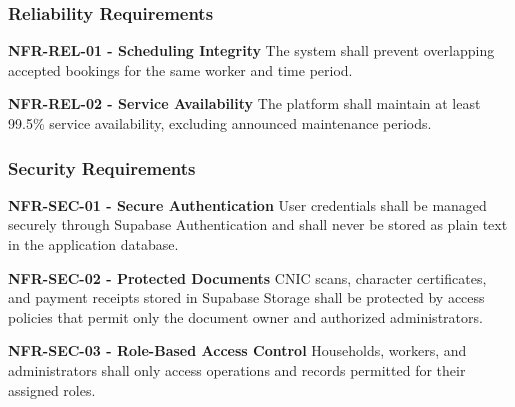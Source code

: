 \documentclass[12pt,a4paper]{article}
\begin{document}
\subsubsection{Reliability Requirements}
\begin{list}{}{\setlength{\leftmargin}{1.5em}\setlength{\labelsep}{0.5em}\setlength{\topsep}{2pt}\setlength{\itemsep}{6pt}\setlength{\parsep}{0pt}}
\item[\textbullet] \textbf{NFR-REL-01 - Scheduling Integrity}\newline{}
The system shall prevent overlapping accepted bookings for the same worker and time period.

\item[\textbullet] \textbf{NFR-REL-02 - Service Availability}\newline{}
The platform shall maintain at least 99.5\% service availability, excluding announced maintenance periods.
\end{list}

\subsubsection{Security Requirements}
\begin{list}{}{\setlength{\leftmargin}{1.5em}\setlength{\labelsep}{0.5em}\setlength{\topsep}{2pt}\setlength{\itemsep}{6pt}\setlength{\parsep}{0pt}}
\item[\textbullet] \textbf{NFR-SEC-01 - Secure Authentication}\newline{}
User credentials shall be managed securely through Supabase Authentication and shall never be stored as plain text in the application database.

\item[\textbullet] \textbf{NFR-SEC-02 - Protected Documents}\newline{}
CNIC scans, character certificates, and payment receipts stored in Supabase Storage shall be protected by access policies that permit only the document owner and authorized administrators.

\item[\textbullet] \textbf{NFR-SEC-03 - Role-Based Access Control}\newline{}
Households, workers, and administrators shall only access operations and records permitted for their assigned roles.
\end{list}
\end{document}
